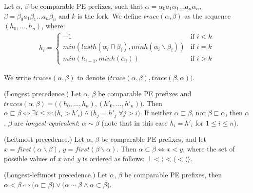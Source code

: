 \documentclass[AMA,STIX1COL]{WileyNJD-v2}
\newcommand{\Xl}{\langle}
\newcommand{\Xr}{\rangle}
\newcommand{\Xm}{\langle\!\rangle}
\begin{document}
    \begin{definition}[Traces]
    \label{def_traces}
    Let $\alpha$, $\beta$ be comparable PE prefixes, such that
    $\alpha = \alpha_0 a_1 \alpha_1 \dots a_n \alpha_n$,
    $\beta = \beta_0 a_1 \beta_1 \dots a_n \beta_n$ and $k$ is the fork.
    We define $trace (\alpha, \beta)$ as the sequence $(h_0, \dots, h_n)$, where:
    \begin{align*}
    h_i = \begin{cases}
        -1 &\text{if } i < k \\[-0.2em]
        min (lasth (\alpha_i \sqcap \beta_i), minh(\alpha_i \backslash \beta_i)) &\text{if } i = k \\[-0.2em]
        min (h_{i-1}, minh(\alpha_i)) &\text{if } i > k
    \end{cases}
    \end{align*}

    We write $traces(\alpha, \beta)$ to denote $\big( trace (\alpha, \beta), trace (\beta, \alpha) \big)$.
    \end{definition}

    \begin{definition}\label{prec1}
    (Longest precedence.)
    Let $\alpha$, $\beta$ be comparable PE prefixes and
    $traces(\alpha, \beta) = \big( (h_0, \dots, h_n), (h'_0, \dots, h'_n) \big)$.
    Then $\alpha \sqsubset \beta \Leftrightarrow \exists i \leq n:
        \big( h_i > h'_i \big) \wedge
        \big( h_j = h'_j \; \forall j > i \big)$.
    If neither $\alpha \sqsubset \beta$, nor $\beta \sqsubset \alpha$,
    then $\alpha$, $\beta$ are \emph{longest-equivalent}: $\alpha \sim \beta$
    (note that in this case $h_i = h'_i$ for $1 \leq i \leq n$).
    \end{definition}

    \begin{definition}\label{prec2}
    (Leftmost precedence.)
    Let $\alpha$, $\beta$ be comparable PE prefixes, and let
    $x = first (\alpha \backslash \beta)$,
    $y = first (\beta \backslash \alpha)$.
    Then $\alpha \subset \beta \Leftrightarrow x < y$, where
    the set of possible values of $x$ and $y$ is ordered as follows:
    $\bot < \Xr < \Xl < \Xm$.
    \end{definition}

    \begin{definition}\label{pe_order}
    (Longest-leftmost precedence.)
    Let $\alpha$, $\beta$ be comparable PE prefixes, then
    $\alpha < \beta \Leftrightarrow
        \big( \alpha \sqsubset \beta \big) \vee
        \big( \alpha \sim \beta \wedge \alpha \subset \beta \big)$.
    \end{definition}
\end{document}
